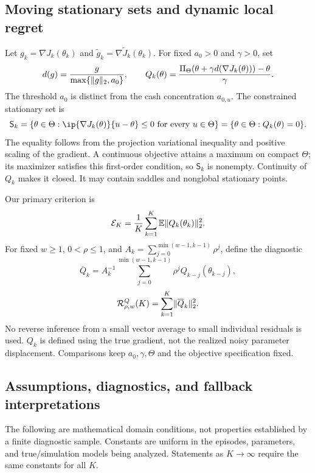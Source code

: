 \documentclass[11pt]{article}
\newcommand{\E}{\mathbb E}
\newcommand{\1}{\mathbf 1}
\DeclarePairedDelimiter{\norm}{\lVert}{\rVert}
\newcommand{\Reg}{\mathcal R}
\newcommand{\Sta}{\mathsf S}
\theoremstyle{definition}
\begin{document}
\subsection{Moving stationary sets and dynamic local regret}
Let $g_k=\nabla J_k(\theta_k)$ and $\widetilde g_k=\nabla\widetilde J_k(\theta_k)$. For fixed $a_0>0$ and $\gamma>0$, set
\begin{equation}\label{eq:normalized-map}
 d(g)=\frac{g}{\max\{\norm{g}_2,a_0\}},\qquad
 Q_k(\theta)=\frac{\Pi_\Theta(\theta+\gamma d(\nabla J_k(\theta)))-\theta}{\gamma}.
\end{equation}
The threshold $a_0$ is distinct from the cash concentration $a_{0,u}$. The constrained stationary set is
\begin{equation}\label{eq:stationary-set}
 \Sta_k=\{\theta\in\Theta:\ip{\nabla J_k(\theta)}{u-\theta}\le0
 \text{ for every }u\in\Theta\}=\{\theta\in\Theta:Q_k(\theta)=0\}.
\end{equation}
The equality follows from the projection variational inequality and positive scaling of the gradient. A continuous objective attains a maximum on compact $\Theta$; its maximizer satisfies this first-order condition, so $\Sta_k$ is nonempty. Continuity of $Q_k$ makes it closed. It may contain saddles and nonglobal stationary points.

Our primary criterion is
\begin{equation}\label{eq:primary-residual}
 \mathcal E_K=\frac1K\sum_{k=1}^K\E\norm{Q_k(\theta_k)}_2^2.
\end{equation}
For fixed $w\ge1$, $0<\rho\le1$, and
$A_k=\sum_{j=0}^{\min(w-1,k-1)}\rho^j$, define the diagnostic
\begin{equation}\label{eq:smoothed-gradient}
 \overline Q_k=A_k^{-1}\sum_{j=0}^{\min(w-1,k-1)}\rho^j
 Q_{k-j}(\theta_{k-j}),
\end{equation}
\begin{equation}\label{eq:dynamic-regret}
 \Reg_{\rho,w}^{Q}(K)=\sum_{k=1}^K\norm{\overline Q_k}_2^2.
\end{equation}
No reverse inference from a small vector average to small individual residuals is used. $Q_k$ is defined using the true gradient, not the realized noisy parameter displacement. Comparisons keep $a_0,\gamma,\Theta$ and the objective specification fixed.

\subsection{Assumptions, diagnostics, and fallback interpretations}\label{subsec:assumptions}
The following are mathematical domain conditions, not properties established by a finite diagnostic sample. Constants are uniform in the episodes, parameters, and true/simulation models being analyzed. Statements as $K\to\infty$ require the same constants for all $K$.
\end{document}
